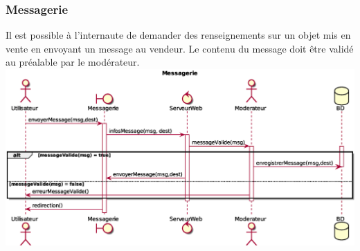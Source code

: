 \subsubsection{Messagerie}
Il est possible à l'internaute de demander des renseignements sur un objet mis en vente en envoyant un message au vendeur. Le contenu du message doit être validé au préalable par le modérateur. \\
\includegraphics[width=17cm]{Images/DSEQ_Messagerie} \\
